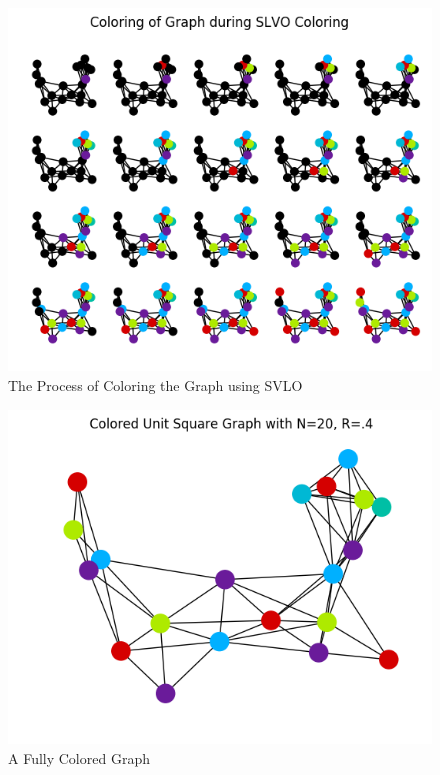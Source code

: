 \documentclass{article}
\begin{document}
    \begin{figure}
      \centering
      \label{coloring_graph}
      \includegraphics[width=1 \textwidth]{walkthrough/coloring}
      \caption{The Process of Coloring the Graph using SVLO}
    \end{figure}

    \begin{figure}
      \centering
      \label{colored_graph}
      \includegraphics[width=1 \textwidth]{walkthrough/final_colored}
      \caption{A Fully Colored Graph}
    \end{figure}
\end{document}
